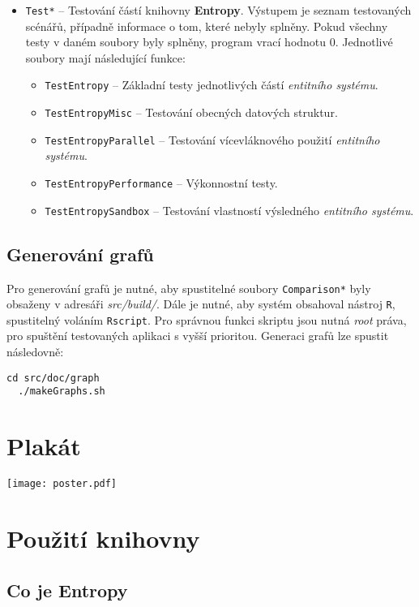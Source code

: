\begin{itemize}
\begin{itemize}
	\end{itemize}
	\item \texttt{Test*} -- Testování částí knihovny \textbf{Entropy}. Výstupem je seznam testovaných scénářů, případně informace o tom, které nebyly splněny. Pokud všechny testy v daném soubory byly splněny, program vrací hodnotu 0. Jednotlivé soubory mají následující funkce: 
	\begin{itemize}
		\item \texttt{TestEntropy} -- Základní testy jednotlivých částí \emph{entitního systému}.
		\item \texttt{TestEntropyMisc} -- Testování obecných datových struktur.
		\item \texttt{TestEntropyParallel} -- Testování vícevláknového použití \emph{entitního systému}.
		\item \texttt{TestEntropyPerformance} -- Výkonnostní testy.
		\item \texttt{TestEntropySandbox} -- Testování vlastností výsledného \emph{entitního systému}.
	\end{itemize}
\end{itemize}

\section*{Generování grafů}
Pro generování grafů je nutné, aby spustitelné soubory \texttt{Comparison*} byly obsaženy v adresáři \emph{src/build/}. Dále je nutné, aby systém obsahoval nástroj \texttt{R}, spustitelný voláním \texttt{Rscript}. Pro správnou funkci skriptu jsou nutná \emph{root} práva, pro spuštění testovaných aplikaci s vyšší prioritou. Generaci grafů lze spustit následovně:
\begin{lstlisting}[basicstyle=\ttfamily]
  cd src/doc/graph
  ./makeGraphs.sh
\end{lstlisting}

\chapter{Plakát}
\begin{center}
	\texttt{[image: poster.pdf]}
\end{center}

\chapter{Použití knihovny}

\section*{Co je Entropy}

